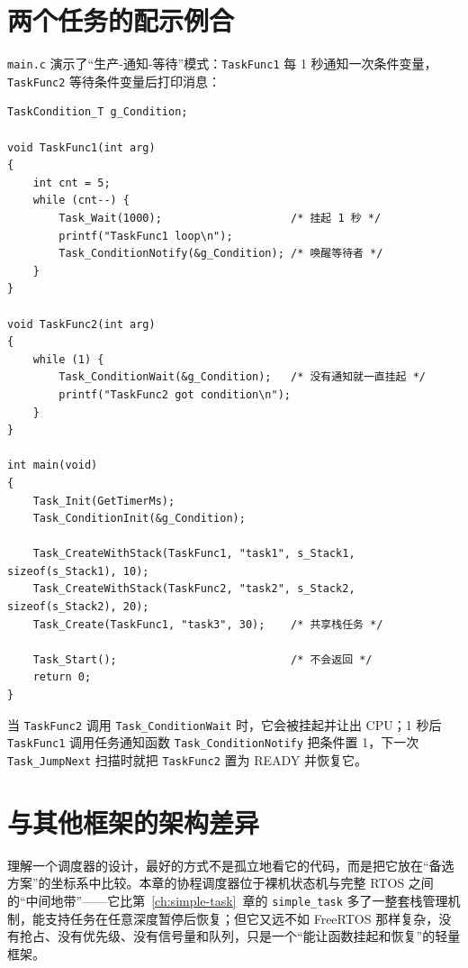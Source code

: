 \section{两个任务的配示例合}

\texttt{main.c} 演示了“生产-通知-等待”模式：\texttt{TaskFunc1} 每 1 秒通知一次条件变量， \texttt{TaskFunc2} 等待条件变量后打印消息：

\begin{lstlisting}[style=c]
TaskCondition_T g_Condition;

void TaskFunc1(int arg)
{
    int cnt = 5;
    while (cnt--) {
        Task_Wait(1000);                    /* 挂起 1 秒 */
        printf("TaskFunc1 loop\n");
        Task_ConditionNotify(&g_Condition); /* 唤醒等待者 */
    }
}

void TaskFunc2(int arg)
{
    while (1) {
        Task_ConditionWait(&g_Condition);   /* 没有通知就一直挂起 */
        printf("TaskFunc2 got condition\n");
    }
}

int main(void)
{
    Task_Init(GetTimerMs);
    Task_ConditionInit(&g_Condition);

    Task_CreateWithStack(TaskFunc1, "task1", s_Stack1, sizeof(s_Stack1), 10);
    Task_CreateWithStack(TaskFunc2, "task2", s_Stack2, sizeof(s_Stack2), 20);
    Task_Create(TaskFunc1, "task3", 30);    /* 共享栈任务 */

    Task_Start();                           /* 不会返回 */
    return 0;
}
\end{lstlisting}

当 \texttt{TaskFunc2} 调用 \texttt{Task\_ConditionWait} 时，它会被挂起并让出 CPU；1 秒后 \texttt{TaskFunc1} 调用任务通知函数 \texttt{Task\_ConditionNotify} 把条件置 1，下一次 \texttt{Task\_JumpNext} 扫描时就把 \texttt{TaskFunc2} 置为 READY 并恢复它。

\section{与其他框架的架构差异}

理解一个调度器的设计，最好的方式不是孤立地看它的代码，而是把它放在“备选方案”的坐标系中比较。本章的协程调度器位于裸机状态机与完整 RTOS 之间的“中间地带”——它比第~\ref{ch:simple-task}~章的 \texttt{simple\_task} 多了一整套栈管理机制，能支持任务在任意深度暂停后恢复；但它又远不如 FreeRTOS 那样复杂，没有抢占、没有优先级、没有信号量和队列，只是一个“能让函数挂起和恢复”的轻量框架。


